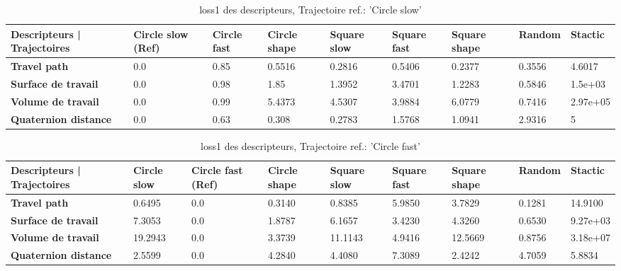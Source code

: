 \documentclass[8pt]{article}
\begin{document}
\begin{table}[H]
    \centering
    \begin{tabularx}{\textwidth}{|p{}|X|X|X|X|X|X|X|X|}
    \rowcolor{lightgray}
        \hline
        Descripteurs | Trajectoires & \cellcolor[HTML]{238CCC} \textbf{Circle slow (Ref)} & Circle fast & Circle shape & Square slow & Square fast & Square shape & Random & Stactic \\ \hline
        \textbf{Travel path} & 0.0 & 0.85 & 0.5516 & 0.2816 & 0.5406 & 0.2377 & 0.3556 & 4.6017 \\ \hline
        \textbf{Surface de travail} & 0.0 & 0.98 & 1.85 & 1.3952 & 3.4701 & 1.2283 & 0.5846 & 1.5e+03 \\ \hline
        \textbf{Volume de travail} & 0.0 & 0.99 & 5.4373 & 4.5307 & 3.9884 & 6.0779 & 0.7416 & 2.97e+05 \\ \hline
        \textbf{Quaternion distance} & 0.0 & 0.63 & 0.308 & 0.2783 & 1.5768 & 1.0941 & 2.9316 & 5 \\ \hline  
    \end{tabularx}
    \caption{loss1 des descripteurs, Trajectoire ref.: 'Circle slow'}
\end{table}
 
 \begin{table}[H]
    \centering
    \begin{tabularx}{\textwidth}{|p{}|X|X|X|X|X|X|X|X|}
    \rowcolor{lightgray}
        \hline
        Descripteurs | Trajectoires &  Circle slow & \cellcolor[HTML]{238CCC}\textbf{Circle fast (Ref)} & Circle shape & Square slow & Square fast & Square shape & Random & Stactic \\ \hline
        \textbf{Travel path} & 0.6495 & 0.0 & 0.3140 & 0.8385 & 5.9850 & 3.7829 & 0.1281 & 14.9100 \\ \hline
        \textbf{Surface de travail} & 7.3053 & 0.0 & 1.8787 & 6.1657 & 3.4230 & 4.3260 & 0.6530 & 9.27e+03 \\ \hline
        \textbf{Volume de travail} & 19.2943 & 0.0 & 3.3739 & 11.1143 & 4.9416 & 12.5669 & 0.8756 & 3.18e+07 \\ \hline
        \textbf{Quaternion distance} & 2.5599 & 0.0 & 4.2840 & 4.4080 & 7.3089 & 2.4242 & 4.7059 & 5.8834 \\ \hline  
    \end{tabularx}
        \caption{loss1 des descripteurs, Trajectoire ref.: 'Circle fast'}

\end{table}
\end{document}
